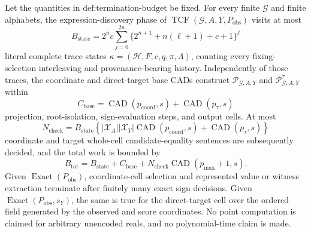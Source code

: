 Let the quantities in \(\text{def:termination-budget}\) be fixed. For every finite \(\mathcal G\) and finite alphabets, the expression-discovery phase of \(\operatorname{TCF}(\mathcal G,A,Y,P_{\mathrm{obs}})\) visits at most
\[
B_{\mathrm{state}}=2^n c\sum_{j=0}^{2n}
\bigl\{2^{n+1}+n(\ell+1)+c+1\bigr\}^j
\]
literal complete trace states \(\kappa=(\mathcal H,F,c,q,\pi,\Lambda)\), counting every fixing-selection interleaving and provenance-bearing history. Independently of those traces, the coordinate and direct-target base CADs construct \(\mathscr P_{\mathcal G,A,Y}\) and \(\mathscr P^{\tau}_{\mathcal G,A,Y}\) within
\[
C_{\mathrm{base}}
=\operatorname{CAD}(p_{\mathrm{coord}},s)
+\operatorname{CAD}(p_{\tau},s)
\]
projection, root-isolation, sign-evaluation steps, and output cells. At most
\[
N_{\mathrm{check}}
=B_{\mathrm{state}}
\left\{|\mathcal X_A||\mathcal X_Y|
\operatorname{CAD}(p_{\mathrm{coord}},s)
+\operatorname{CAD}(p_{\tau},s)\right\}
\]
coordinate and target whole-cell candidate-equality sentences are subsequently decided, and the total work is bounded by
\[
B_{\mathrm{tot}}
=B_{\mathrm{state}}+C_{\mathrm{base}}
+N_{\mathrm{check}}\operatorname{CAD}(p_{\max}+1,s).
\]
Given \(\operatorname{Exact}(P_{\mathrm{obs}})\), coordinate-cell selection and represented value or witness extraction terminate after finitely many exact sign decisions. Given \(\operatorname{Exact}(P_{\mathrm{obs}},s_Y)\), the same is true for the direct-target cell over the ordered field generated by the observed and score coordinates. No point computation is claimed for arbitrary unencoded reals, and no polynomial-time claim is made.